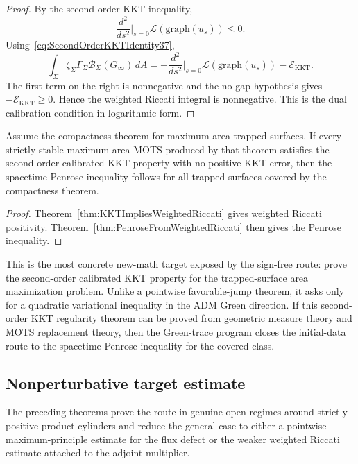 \begin{proof}
By the second-order KKT inequality,
\[
    \frac{d^2}{ds^2}\bigg|_{s=0}\mathscr L(\mathrm{graph}(u_s))\le0 .
\]
Using~\eqref{eq:SecondOrderKKTIdentity37},
\[
    \int_\Sigma
        \zeta_\Sigma\Gamma_\Sigma
        \mathcal B_\Sigma(G_\infty)\,dA
    =
    -\frac{d^2}{ds^2}\bigg|_{s=0}\mathscr L(\mathrm{graph}(u_s))
    -\mathcal E_{\mathrm{KKT}} .
\]
The first term on the right is nonnegative and the no-gap hypothesis gives \(-\mathcal E_{\mathrm{KKT}}\ge0\). Hence the weighted Riccati integral is nonnegative. This is the dual calibration condition in logarithmic form.
\end{proof}

\begin{corollary}\label{cor:PenroseFromSecondOrderKKT}
Assume the compactness theorem for maximum-area trapped surfaces. If every strictly stable maximum-area MOTS produced by that theorem satisfies the second-order calibrated KKT property with no positive KKT error, then the spacetime Penrose inequality follows for all trapped surfaces covered by the compactness theorem.
\end{corollary}

\begin{proof}
Theorem~\ref{thm:KKTImpliesWeightedRiccati} gives weighted Riccati positivity. Theorem~\ref{thm:PenroseFromWeightedRiccati} then gives the Penrose inequality.
\end{proof}

\begin{remark}\label{rem:BreakthroughTarget37}
This is the most concrete new-math target exposed by the sign-free route: prove the second-order calibrated KKT property for the trapped-surface area maximization problem. Unlike a pointwise favorable-jump theorem, it asks only for a quadratic variational inequality in the ADM Green direction. If this second-order KKT regularity theorem can be proved from geometric measure theory and MOTS replacement theory, then the Green-trace program closes the initial-data route to the spacetime Penrose inequality for the covered class.
\end{remark}

\subsection{Nonperturbative target estimate}

The preceding theorems prove the route in genuine open regimes around strictly positive product cylinders and reduce the general case to either a pointwise maximum-principle estimate for the flux defect or the weaker weighted Riccati estimate attached to the adjoint multiplier.

